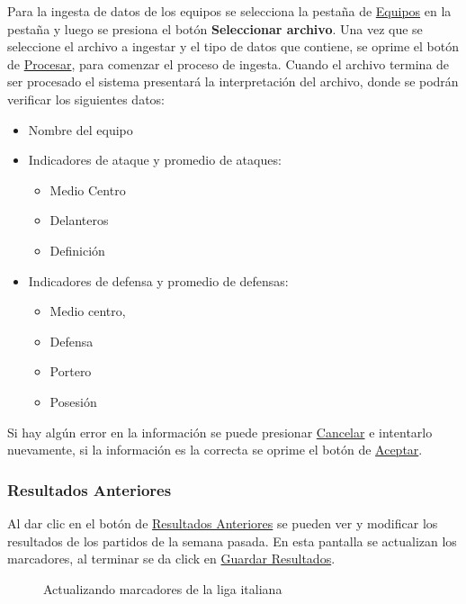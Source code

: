 Para la ingesta de datos de los equipos se selecciona la pestaña de \underline{Equipos} en la pestaña y luego se presiona el botón \textbf{Seleccionar archivo}.
Una vez que se seleccione el archivo a ingestar y el tipo de datos que contiene, se oprime el botón de \underline{Procesar}, para comenzar el proceso de ingesta.
Cuando el archivo termina de ser procesado el sistema presentará la interpretación del archivo, donde se podrán verificar los siguientes datos:
\begin{itemize}
\item Nombre del equipo
\item Indicadores de ataque y promedio de ataques:
	\begin{itemize}
		\item Medio Centro
		\item Delanteros
		\item Definición
	\end{itemize}
\item Indicadores de defensa y promedio de defensas:
	\begin{itemize}
		\item Medio centro,
		\item Defensa
		\item Portero
		\item Posesión
	\end{itemize}
\end{itemize}

Si hay algún error en la información se puede presionar \underline{Cancelar} e intentarlo nuevamente, si la información es la correcta se oprime el botón de \underline{Aceptar}.


\subsubsection{Resultados Anteriores}

Al dar clic en el botón de \underline{Resultados Anteriores} se pueden ver y modificar los resultados de los partidos de la semana pasada. En esta pantalla se actualizan los marcadores, al terminar se da click en \underline{Guardar Resultados}.

\begin{figure}[!htb]\centering
   \begin {minipage}{0.64\textwidth}
     \caption[Actualizar resultados Anteriores]{Actualizando marcadores de la liga italiana}
	 \label{Fig:Resultados-anteriores}
   \end{minipage}
\end{figure}

